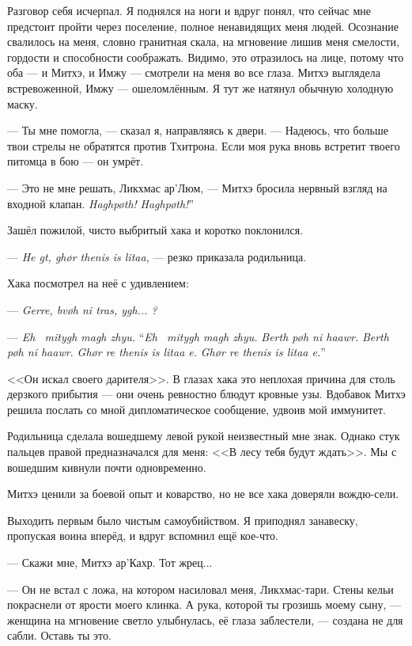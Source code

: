 Разговор себя исчерпал.
Я поднялся на ноги и вдруг понял, что сейчас мне предстоит пройти через поселение, полное ненавидящих меня людей.
Осознание свалилось на меня, словно гранитная скала, на мгновение лишив меня смелости, гордости и способности соображать.
Видимо, это отразилось на лице, потому что оба --- и Митхэ, и Имжу --- смотрели на меня во все глаза.
Митхэ выглядела встревоженной, Имжу --- ошеломлённым.
Я тут же натянул обычную холодную маску.

--- Ты мне помогла, --- сказал я, направляясь к двери.
--- Надеюсь, что больше твои стрелы не обратятся против Тхитрона.
Если моя рука вновь встретит твоего питомца в бою --- он умрёт.

--- Это не мне решать, Ликхмас ар’Люм, --- Митхэ бросила нервный взгляд на входной клапан.
{\textit{Haghp\o{}th!}}
{\textit{Haghp\o{}th!}''}

Зашёл пожилой, чисто выбритый хака и коротко поклонился.

--- \textit{He gt, gh\o{}r thenis is litaa}, --- резко приказала родильница.

Хака посмотрел на неё с удивлением:

--- \textit{Gerre, bv\o{}h ni tras, ygh... \Seli?}

{--- \textit{Eh \Seli\ mitygh magh zhyu.}}
{``\textit{Eh \Seli\ mitygh magh zhyu.}}
{\textit{Berth p\o{}h ni haawr.}}
{\textit{Berth p\o{}h ni haawr.}}
{\textit{Gh\o{}r re thenis is litaa e.}}
{\textit{Gh\o{}r re thenis is litaa e.}''}

<<Он искал своего дарителя>>.
В глазах хака это неплохая причина для столь дерзкого прибытия --- они очень ревностно блюдут кровные узы.
Вдобавок Митхэ решила послать со мной дипломатическое сообщение, удвоив мой иммунитет.

Родильница сделала вошедшему левой рукой неизвестный мне знак.
Однако стук пальцев правой предназначался для меня: <<В лесу тебя будут ждать>>.
Мы с вошедшим кивнули почти одновременно.

Митхэ ценили за боевой опыт и коварство, но не все хака доверяли вождю-сели.

Выходить первым было чистым самоубийством.
Я приподнял занавеску, пропуская воина вперёд, и вдруг вспомнил ещё кое-что.

--- Скажи мне, Митхэ ар’Кахр.
Тот жрец...

--- Он не встал с ложа, на котором насиловал меня, Ликхмас-тари.
Стены кельи покраснели от ярости моего клинка.
А рука, которой ты грозишь моему сыну, --- женщина на мгновение светло улыбнулась, её глаза заблестели, --- создана не для сабли.
Оставь ты это.

